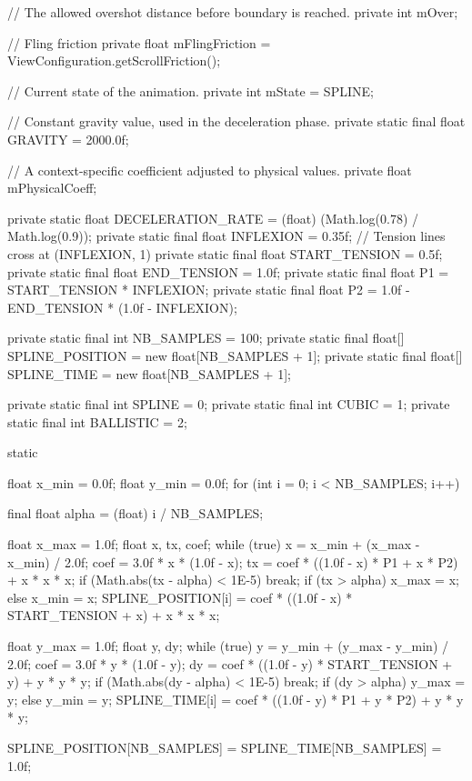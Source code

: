 {{        // The allowed overshot distance before boundary is reached.
        private int mOver;

        // Fling friction
        private float mFlingFriction = ViewConfiguration.getScrollFriction();

        // Current state of the animation.
        private int mState = SPLINE;

        // Constant gravity value, used in the deceleration phase.
        private static final float GRAVITY = 2000.0f;

        // A context-specific coefficient adjusted to physical values.
        private float mPhysicalCoeff;

        private static float DECELERATION_RATE = (float) (Math.log(0.78) / Math.log(0.9));
        private static final float INFLEXION = 0.35f; // Tension lines cross at (INFLEXION, 1)
        private static final float START_TENSION = 0.5f;
        private static final float END_TENSION = 1.0f;
        private static final float P1 = START_TENSION * INFLEXION;
        private static final float P2 = 1.0f - END_TENSION * (1.0f - INFLEXION);

        private static final int NB_SAMPLES = 100;
        private static final float[] SPLINE_POSITION = new float[NB_SAMPLES + 1];
        private static final float[] SPLINE_TIME = new float[NB_SAMPLES + 1];

        private static final int SPLINE = 0;
        private static final int CUBIC = 1;
        private static final int BALLISTIC = 2;

        static {
            float x_min = 0.0f;
            float y_min = 0.0f;
            for (int i = 0; i < NB_SAMPLES; i++) {
                final float alpha = (float) i / NB_SAMPLES;

                float x_max = 1.0f;
                float x, tx, coef;
                while (true) {
                    x = x_min + (x_max - x_min) / 2.0f;
                    coef = 3.0f * x * (1.0f - x);
                    tx = coef * ((1.0f - x) * P1 + x * P2) + x * x * x;
                    if (Math.abs(tx - alpha) < 1E-5) break;
                    if (tx > alpha) x_max = x;
                    else x_min = x;
                }
                SPLINE_POSITION[i] = coef * ((1.0f - x) * START_TENSION + x) + x * x * x;

                float y_max = 1.0f;
                float y, dy;
                while (true) {
                    y = y_min + (y_max - y_min) / 2.0f;
                    coef = 3.0f * y * (1.0f - y);
                    dy = coef * ((1.0f - y) * START_TENSION + y) + y * y * y;
                    if (Math.abs(dy - alpha) < 1E-5) break;
                    if (dy > alpha) y_max = y;
                    else y_min = y;
                }
                SPLINE_TIME[i] = coef * ((1.0f - y) * P1 + y * P2) + y * y * y;
            }
            SPLINE_POSITION[NB_SAMPLES] = SPLINE_TIME[NB_SAMPLES] = 1.0f;
        }

}}
